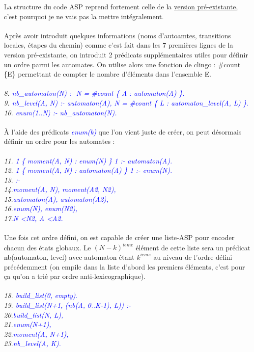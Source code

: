 \documentclass[12pt,a4paper]{article}
\begin{document}
La structure du code ASP reprend fortement celle de la \hyperlink{preexistante}{version pré-existante}, c'est pourquoi je ne vais pas la mettre intégralement.\\ \\
Après avoir introduit quelques informations (noms d'autoamtes, transitions locales, étapes du chemin) comme c'est fait dans les 7 premières lignes de la version pré-existante, on introduit 2 prédicats supplémentaires utiles pour 
définir un ordre parmi les automates. On utilise alors une fonction de clingo : \#count \{E\} permettant de compter le nombre d'éléments dans l'ensemble E.\\ \\
\emph{
	8. \textcolor{blue}{nb\_automaton(N) :- N = \#count \{ A : automaton(A) \}.}\\
	9. \textcolor{blue}{nb\_level(A, N) :- automaton(A), N = \#count \{ L : automaton\_level(A, L) \}.}\\
	10. \textcolor{blue}{enum(1..N) :- nb\_automaton(N).}\\ \\
}
\`A l'aide des prédicats \emph{\textcolor{blue}{enum(k)}} que l'on vient juste de créer, on peut désormais définir un ordre pour les automates :\\ \\
\emph{
	11. \textcolor{blue}{1 \{ moment(A, N) : enum(N) \} 1 :- automaton(A).}\\
	12. \textcolor{blue}{1 \{ moment(A, N) : automaton(A) \} 1 :- enum(N).}\\
	13. \textcolor{blue}{:- }\\
	14.\qquad\textcolor{blue}{moment(A, N), moment(A2, N2),}\\
	15.\qquad\textcolor{blue}{automaton(A), automaton(A2),}\\
	16.\qquad\textcolor{blue}{enum(N), enum(N2),}\\
	17.\qquad\textcolor{blue}{N \textless N2, A \textless A2.}\\ \\
}
Une fois cet ordre défini, on est capable de créer une liste-ASP pour encoder chacun des états globaux. Le $(N-k)^{ieme}$ élément de cette liste sera un prédicat nb(automaton, level) avec automaton étant $k^{ieme}$ au niveau de 
l'ordre défini précédemment (on empile dans la liste d'abord les premiers éléments, c'est pour ça qu'on a trié par ordre anti-lexicographique).\\ \\
\emph{
	18. \textcolor{blue}{build\_list(0, empty).}\\
	19. \textcolor{blue}{build\_list(N+1, (nb(A, 0..K-1), L)) :-}\\ 
	20.\qquad\textcolor{blue}{build\_list(N, L),}\\
	21.\qquad\textcolor{blue}{enum(N+1),}\\
	22.\qquad\textcolor{blue}{moment(A, N+1),}\\
	23.\qquad\textcolor{blue}{nb\_level(A, K).}\\ \\
}
\end{document}
